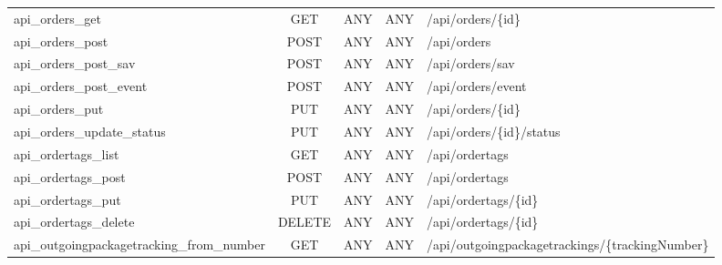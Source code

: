 \documentclass[a4paper]{article}
\begin{document}
{\begin{tabular}{lcccl}
 {\color{monOrange}  api\_orders\_get}                                                  &      {\color{monOrange} GET}   &     ANY   &   ANY  & {\color{monOrange}  /api/orders/\{id\}}                                                        \\                    
 api\_orders\_post                                               &       POST    &   ANY   &   ANY &   /api/orders                                                               \\                  
 api\_orders\_post\_sav                                      &            POST  &     ANY  &    ANY &   /api/orders/sav                                                    \\                         
 api\_orders\_post\_event                                   &             POST  &     ANY  &    ANY  &  /api/orders/event                                              \\                             
 api\_orders\_put                                                &       PUT   &     ANY   &   ANY  &  /api/orders/\{id\}                                                     \\                       
 api\_orders\_update\_status                              &               PUT   &     ANY  &    ANY &   /api/orders/\{id\}/status                                   \\                                  
 api\_ordertags\_list                                             &      GET     &   ANY   &   ANY   & /api/ordertags                                                           \\                   
 api\_ordertags\_post                                           &        POST   &    ANY  &    ANY  &  /api/ordertags                                                        \\                      
 api\_ordertags\_put                                            &        PUT     &   ANY   &   ANY  &  /api/ordertags/\{id\}                                                 \\                        
 api\_ordertags\_delete                                         &        DELETE &    ANY  &    ANY &   /api/ordertags/\{id\}                                              \\                           
 api\_outgoingpackagetracking\_from\_number     &   GET    &    ANY  &    ANY  &  /api/outgoingpackagetrackings/\{trackingNumber\}    \\                                          

\end{tabular}}
\end{document}
